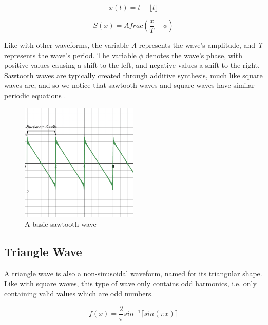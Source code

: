 \begin{equation}
	x(t) = t - \lfloor t \rfloor
	\label{eq:sawtooth-piecewise-function}
\end{equation}

\begin{equation}
	S(x) = Afrac(\frac{x}{T} + \phi)
	\label{eq:sawtooth-sinusoidal-function}
\end{equation}

Like with other waveforms, the variable \textit{A} represents the wave's amplitude, and \textit{T} represents the wave's period. The variable $\phi$ denotes the wave's phase, with positive values causing a shift to the left, and negative values a shift to the right. Sawtooth waves are typically created through additive synthesis, much like square waves are, and so we notice that sawtooth waves and square waves have similar periodic equations \cite{Tarr_2019}.

\begin{figure}
  \centering
  \includegraphics[width=0.5\textwidth]{figures/sawtooth-wave.png}
  \caption{A basic sawtooth wave}
  \label{fig:basic-sawtooth-wave}
\end{figure}


\subsection{Triangle Wave}

A triangle wave is also a non-sinusoidal waveform, named for its triangular shape. Like with square waves, this type of wave only contains odd harmonics, i.e. only containing valid values which are odd numbers.

\begin{equation}
	f(x) = \frac{2}{\pi}sin^{-1}\lceil sin(\pi x) \rceil
	\label{eq:triangle-wave-function}	
\end{equation}

